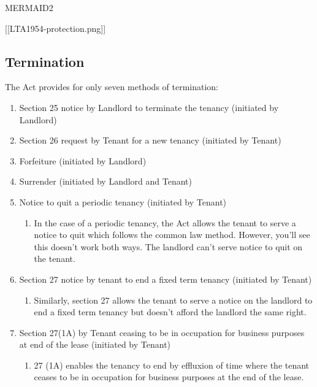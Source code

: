 \documentclass[
]{article}
\providecommand{\tightlist}{%
  \setlength{\itemsep}{0pt}\setlength{\parskip}{0pt}}
\begin{document}
MERMAID2

{[}{[}LTA1954-protection.png{]}{]}

\hypertarget{termination-1}{%
\subsection{Termination}\label{termination-1}}

The Act provides for only seven methods of termination:

\begin{enumerate}
\def\labelenumi{\arabic{enumi}.}
\tightlist
\item
  Section 25 notice by Landlord to terminate the tenancy (initiated by
  Landlord)
\item
  Section 26 request by Tenant for a new tenancy (initiated by Tenant)
\item
  Forfeiture (initiated by Landlord)
\item
  Surrender (initiated by Landlord and Tenant)
\item
  Notice to quit a periodic tenancy (initiated by Tenant)

  \begin{enumerate}
  \def\labelenumii{\arabic{enumii}.}
  \tightlist
  \item
    In the case of a periodic tenancy, the Act allows the tenant to
    serve a notice to quit which follows the common law method. However,
    you'll see this doesn't work both ways. The landlord can't serve
    notice to quit on the tenant.
  \end{enumerate}
\item
  Section 27 notice by tenant to end a fixed term tenancy (initiated by
  Tenant)

  \begin{enumerate}
  \def\labelenumii{\arabic{enumii}.}
  \tightlist
  \item
    Similarly, section 27 allows the tenant to serve a notice on the
    landlord to end a fixed term tenancy but doesn't afford the landlord
    the same right.
  \end{enumerate}
\item
  Section 27(1A) by Tenant ceasing to be in occupation for business
  purposes at end of the lease (initiated by Tenant)

  \begin{enumerate}
  \def\labelenumii{\arabic{enumii}.}
  \tightlist
  \item
    27 (1A) enables the tenancy to end by effluxion of time where the
    tenant ceases to be in occupation for business purposes at the end
    of the lease.
  \end{enumerate}
\end{enumerate}
\end{document}
